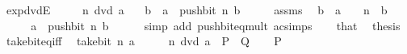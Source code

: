 \begin{isabellebody}
\isamarkupfalse%
%
\endisatagproof
{\isafoldproof}%
%
\isadelimproof
\isanewline
%
\endisadelimproof
\isanewline
{}\isamarkupfalse%
\ exp{\isacharunderscore}{\kern0pt}dvdE{\isacharcolon}{\kern0pt}\isanewline
\ \ \ {\isacartoucheopen}{}\ {\isacharcircum}{\kern0pt}\ n\ dvd\ a{\isacartoucheclose}\isanewline
\ \ \ b\ \ {\isacartoucheopen}a\ {\isacharequal}{\kern0pt}\ push{\isacharunderscore}{\kern0pt}bit\ n\ b{\isacartoucheclose}\isanewline
%
\isadelimproof
%
\endisadelimproof
%
\isatagproof
{}\isamarkupfalse%
\ {\isacharminus}{\kern0pt}\isanewline
\ \ \isamarkupfalse%
\ assms\ \isamarkupfalse%
\ b\ \ {\isacartoucheopen}a\ {\isacharequal}{\kern0pt}\ {}\ {\isacharcircum}{\kern0pt}\ n\ {\isacharasterisk}{\kern0pt}\ b{\isacartoucheclose}\ \isacommand{{\isachardot}{\kern0pt}{\isachardot}{\kern0pt}}\isamarkupfalse%
\isanewline
\ \ \isamarkupfalse%
\ \isamarkupfalse%
\ {\isacartoucheopen}a\ {\isacharequal}{\kern0pt}\ push{\isacharunderscore}{\kern0pt}bit\ n\ b{\isacartoucheclose}\isanewline
\ \ \ \ \isamarkupfalse%
\ {\isacharparenleft}{\kern0pt}simp\ add{\isacharcolon}{\kern0pt}\ push{\isacharunderscore}{\kern0pt}bit{\isacharunderscore}{\kern0pt}eq{\isacharunderscore}{\kern0pt}mult\ ac{\isacharunderscore}{\kern0pt}simps{\isacharparenright}{\kern0pt}\isanewline
\ \ \isamarkupfalse%
\ that\ \isamarkupfalse%
\ thesis\ \isacommand{{\isachardot}{\kern0pt}}\isamarkupfalse%
\isanewline
{}\isamarkupfalse%
%
\endisatagproof
{\isafoldproof}%
%
\isadelimproof
\isanewline
%
\endisadelimproof
\isanewline
{}\isamarkupfalse%
\ take{\isacharunderscore}{\kern0pt}bit{\isacharunderscore}{\kern0pt}eq{\isacharunderscore}{\kern0pt}{}{\isacharunderscore}{\kern0pt}iff{\isacharcolon}{\kern0pt}\isanewline
\ \ {\isacartoucheopen}take{\isacharunderscore}{\kern0pt}bit\ n\ a\ {\isacharequal}{\kern0pt}\ {}\ {\isasymlongleftrightarrow}\ {}\ {\isacharcircum}{\kern0pt}\ n\ dvd\ a{\isacartoucheclose}\ {\isacharparenleft}{\kern0pt}\ {\isacartoucheopen}{\isacharquery}{\kern0pt}P\ {\isasymlongleftrightarrow}\ {\isacharquery}{\kern0pt}Q{\isacartoucheclose}{\isacharparenright}{\kern0pt}\isanewline
%
\isadelimproof
%
\endisadelimproof
%
\isatagproof
{}\isamarkupfalse%
\isanewline
\ \ \isamarkupfalse%
\ {\isacharquery}{\kern0pt}P\isanewline

\end{isabellebody}
